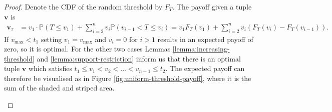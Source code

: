 \documentclass[11pt,a4paper]{article}
\numberwithin{equation}{section}
\begin{document}
\begin{proof}
    Denote the CDF of the random threshold by $F_T$. The payoff given a tuple $\boldsymbol{v}$ is
    \begin{align*}
        \boldsymbol{v}_{\tau}&=v_1\cdot\mathbb{P}(T\le v_1)+\sum_{i=2}^nv_i\mathbb{P}(v_{i-1}<T\le v_i)=v_1F_T(v_1)+\sum_{i=2}^nv_i(F_T(v_i)-F_T(v_{i-1})).
    \end{align*}
    If $v_{\max}<t_1$ setting $v_1=v_{\max}$ and $v_i=0$ for $i>1$ results in an expected payoff of zero, so it is optimal. For the other two cases Lemmas \ref{lemma:increasing-threshold} and \ref{lemma:support-restriction} inform us that there is an optimal tuple $\boldsymbol{v}$ which satisfies $t_1\le v_1<v_2<\dots<v_{n-1}\le t_2$. The expected payoff can therefore be visualised as in Figure \ref{fig:uniform-threshold-payoff}, where it is the sum of the shaded and striped area.
\begin{figure}[!ht]
        \begin{minipage}[b]{0.5\textwidth}
            \centering
\end{minipage}
\end{figure}
\end{proof}
\end{document}
